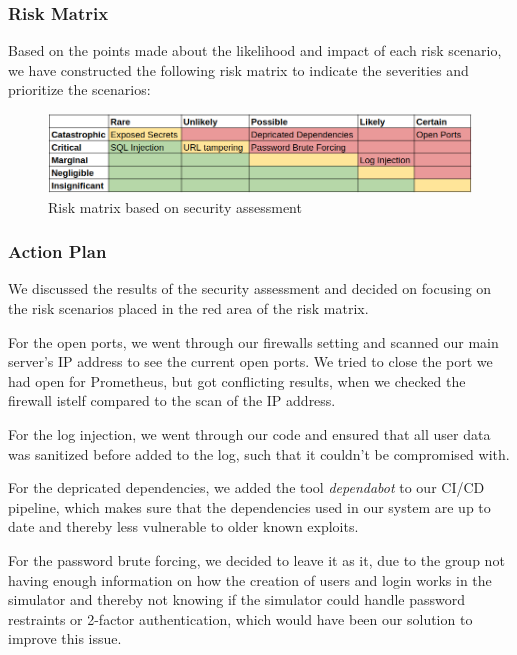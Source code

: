 \subsubsection{Risk Matrix}
Based on the points made about the likelihood and impact of each risk scenario, we have constructed the following risk matrix to indicate the severities and prioritize the scenarios:
\begin{figure}[H]
    \centering
    \includegraphics[width=0.7\linewidth]{images/risk-matrix.png}
    \caption{Risk matrix based on security assessment}
    \label{fig:enter-label}
\end{figure}
\subsubsection{Action Plan}
We discussed the results of the security assessment and decided on focusing on the risk scenarios placed in the red area of the risk matrix.

For the open ports, we went through our firewalls setting and scanned our main server's IP address to see the current open ports. We tried to close the port we had open for Prometheus, but got conflicting results, when we checked the firewall istelf compared to the scan of the IP address.

For the log injection, we went through our code and ensured that all user data was sanitized before added to the log, such that it couldn't be compromised with.

For the depricated dependencies, we added the tool \textit{dependabot} to our CI/CD pipeline, which makes sure that the dependencies used in our system are up to date and thereby less vulnerable to older known exploits.

For the password brute forcing, we decided to leave it as it, due to the group not having enough information on how the creation of users and login works in the simulator and thereby not knowing if the simulator could handle password restraints or 2-factor authentication, which would have been our solution to improve this issue.
